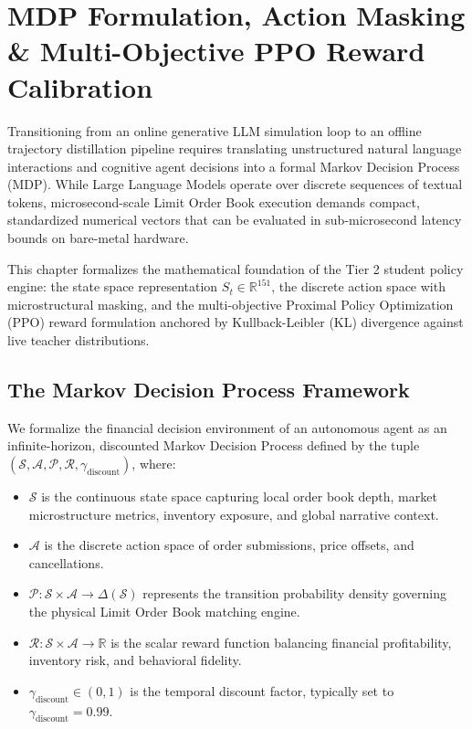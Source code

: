 \chapter{MDP Formulation, Action Masking \& Multi-Objective PPO Reward Calibration}
\label{ch:mdp_formulation}

Transitioning from an online generative LLM simulation loop to an offline trajectory distillation pipeline requires translating unstructured natural language interactions and cognitive agent decisions into a formal Markov Decision Process (MDP). While Large Language Models operate over discrete sequences of textual tokens, microsecond-scale Limit Order Book execution demands compact, standardized numerical vectors that can be evaluated in sub-microsecond latency bounds on bare-metal hardware.

This chapter formalizes the mathematical foundation of the Tier 2 student policy engine: the state space representation $S_t \in \mathbb{R}^{151}$, the discrete action space with microstructural masking, and the multi-objective Proximal Policy Optimization (PPO) reward formulation anchored by Kullback-Leibler (KL) divergence against live teacher distributions.

\section{The Markov Decision Process Framework}

We formalize the financial decision environment of an autonomous agent as an infinite-horizon, discounted Markov Decision Process defined by the tuple $(\mathcal{S}, \mathcal{A}, \mathcal{P}, \mathcal{R}, \gamma_{\text{discount}})$, where:
\begin{itemize}
    \item $\mathcal{S}$ is the continuous state space capturing local order book depth, market microstructure metrics, inventory exposure, and global narrative context.
    \item $\mathcal{A}$ is the discrete action space of order submissions, price offsets, and cancellations.
    \item $\mathcal{P}: \mathcal{S} \times \mathcal{A} \to \Delta(\mathcal{S})$ represents the transition probability density governing the physical Limit Order Book matching engine.
    \item $\mathcal{R}: \mathcal{S} \times \mathcal{A} \to \mathbb{R}$ is the scalar reward function balancing financial profitability, inventory risk, and behavioral fidelity.
    \item $\gamma_{\text{discount}} \in (0, 1)$ is the temporal discount factor, typically set to $\gamma_{\text{discount}} = 0.99$.
\end{itemize}

